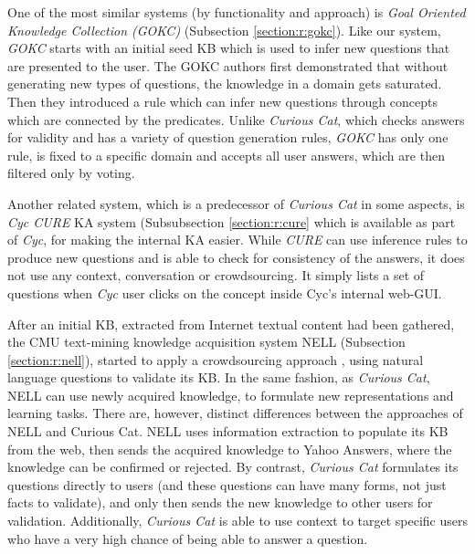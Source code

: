 One of the most similar systems (by functionality and approach) is 
\emph{Goal Oriented Knowledge Collection (GOKC)} (Subsection \ref{section:r:gokc}). 
Like our system, \emph{GOKC} starts with an initial seed KB which is used 
to infer new questions that are presented to the user. The GOKC authors first 
demonstrated that without generating new types of questions, the knowledge in 
a domain gets saturated. Then they introduced a rule which can infer new 
questions through concepts which are connected by the predicates. Unlike 
\emph{Curious Cat}, which checks answers for validity and has a variety of 
question generation rules, \emph{GOKC} has only one rule, is fixed to a 
specific domain and accepts all user answers, which are then filtered only by 
voting.

Another related system, which is a predecessor of \emph{Curious Cat} in some 
aspects, is \emph{Cyc CURE} KA system (Subsubsection \ref{section:r:cure} which is available as part of \emph{Cyc}, for making the internal KA easier. While 
\emph{CURE} can use inference rules to produce new questions and is able to
check for consistency of the answers, it does not use any context, conversation
or crowdsourcing. It simply lists a set of questions when \emph{Cyc} user clicks
on the concept inside Cyc's internal web-GUI.

After an initial KB, extracted from Internet textual content had been gathered, 
the CMU text-mining knowledge acquisition system NELL 
(Subsection \ref{section:r:nell}), started to apply a crowdsourcing approach
\parencite{Pedro2013}, using natural language questions to validate its KB. 
In the same fashion, as \emph{Curious Cat}, NELL can use newly acquired 
knowledge, to formulate new representations and learning tasks. There are, 
however, distinct differences between the approaches of NELL and Curious Cat. 
NELL uses information extraction to populate its KB from the web, then sends 
the acquired knowledge to Yahoo Answers, where the knowledge can be confirmed 
or rejected. By contrast, \emph{Curious Cat} formulates its questions directly 
to users (and these questions can have many forms, not just facts to validate), 
and only then sends the new knowledge to other users for validation. 
Additionally, \emph{Curious Cat} is able to use context to target specific 
users who have a very high chance of being able to answer a question.


